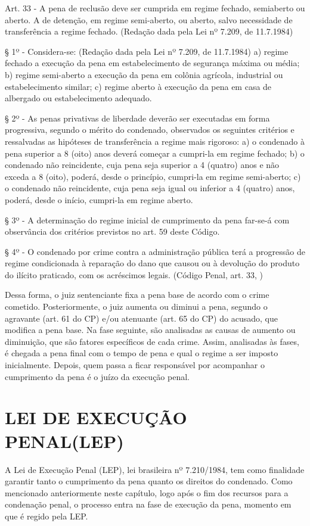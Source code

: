 \begin{citacao}
Art. 33 - A pena de reclusão deve ser cumprida em regime fechado, semiaberto ou aberto. A de detenção, em regime semi-aberto, ou aberto, salvo necessidade de transferência a regime fechado. (Redação dada pela Lei nº 7.209, de 11.7.1984)

§ 1º - Considera-se: (Redação dada pela Lei nº 7.209, de 11.7.1984)
a) regime fechado a execução da pena em estabelecimento de segurança máxima ou média;
b) regime semi-aberto a execução da pena em colônia agrícola, industrial ou estabelecimento similar;
c) regime aberto à execução da pena em casa de albergado ou estabelecimento adequado.

§ 2º - As penas privativas de liberdade deverão ser executadas em forma progressiva, segundo o mérito do condenado, observados os seguintes critérios e ressalvadas as hipóteses de transferência a regime mais rigoroso:
a) o condenado à pena superior a 8 (oito) anos deverá começar a cumpri-la em regime fechado;
b) o condenado não reincidente, cuja pena seja superior a 4 (quatro) anos e não exceda a 8 (oito), poderá, desde o princípio, cumpri-la em regime semi-aberto;
c) o condenado não reincidente, cuja pena seja igual ou inferior a 4 (quatro) anos, poderá, desde o início, cumpri-la em regime aberto.

§ 3º - A determinação do regime inicial de cumprimento da pena far-se-á com observância dos critérios previstos no art. 59 deste Código.

§ 4º - O condenado por crime contra a administração pública terá a progressão de regime condicionada à reparação do dano que causou ou à devolução do produto do ilícito praticado, com os acréscimos legais.
(Código Penal, art. 33, \cite{codigoPenal})
\end{citacao}

Dessa forma, o juiz sentenciante fixa a pena base de acordo com o crime cometido. Posteriormente, o juiz aumenta ou diminui a pena, segundo o agravante (art. 61 do CP) e/ou atenuante (art. 65 do CP) do acusado, que modifica a pena base. Na fase seguinte, são analisadas as causas de aumento ou diminuição, que são fatores específicos de cada crime. Assim, analisadas às fases, é chegada a pena final com o tempo de pena e qual o regime a ser imposto inicialmente. Depois, quem passa a ficar responsável por acompanhar o cumprimento da pena é o juízo da execução penal.\cite{codigoPenal}

\section{LEI DE EXECUÇÃO PENAL(LEP)}
A Lei de Execução Penal (LEP), lei brasileira nº 7.210/1984, tem como finalidade garantir tanto o cumprimento da pena quanto os direitos do condenado. Como mencionado anteriormente neste capítulo, logo após o fim dos recursos para a condenação penal, o processo entra na fase de execução da pena, momento em que é regido pela LEP.\cite{lep}

